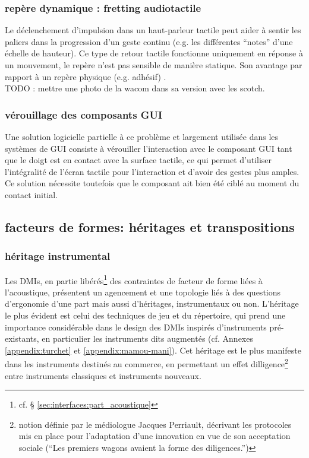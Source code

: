 \subsubsection{repère dynamique : fretting audiotactile}
Le déclenchement d'impulsion dans un haut-parleur tactile peut aider à sentir les paliers dans la progression d'un geste continu (e.g. les différentes ``notes'' d'une échelle de hauteur). Ce type de retour tactile fonctionne uniquement en réponse à un mouvement, le repère n'est pas sensible de manière statique. Son avantage par rapport à un repère physique (e.g. adhésif) .\\
TODO : mettre une photo de la wacom dans sa version avec les scotch.

\subsubsection{vérouillage des composants GUI}
Une solution logicielle partielle à ce problème et largement utilisée dans les systèmes de \gls{GUI} consiste à vérouiller l'interaction avec le composant GUI tant que le doigt est en contact avec la surface tactile, ce qui permet d'utiliser l'intégralité de l'écran tactile pour l'interaction et d'avoir des gestes plus amples. Ce solution nécessite toutefois que le composant ait bien été ciblé au moment du contact initial.



\subsection{facteurs de formes: héritages et transpositions}

\subsubsection{héritage instrumental}

\noindent Les \glspl{DMI}, en partie libérés\footnote{cf. § \ref{sec:interfaces:part_acoustique}} des contraintes de facteur de forme liées à l'acoustique, présentent un agencement et une topologie liés à des questions d'ergonomie d'une part mais aussi d'héritages, instrumentaux ou non. L'héritage le plus évident est celui des techniques de jeu et du répertoire, qui prend une importance considérable dans le design des \glspl{DMI} inspirés d'instruments pré-existants, en particulier les instruments dits augmentés (cf. Annexes \ref{appendix:turchet} et \ref{appendix:mamou-mani}). Cet héritage est le plus manifeste dans les instruments destinés au commerce, en permettant un effet dilligence\footnote{notion définie par le médiologue Jacques Perriault, décrivant les protocoles mis en place pour l'adaptation d'une innovation en vue de son acceptation sociale (``Les premiers wagons avaient la forme des diligences.'')} entre instruments classiques et instruments nouveaux.\\

